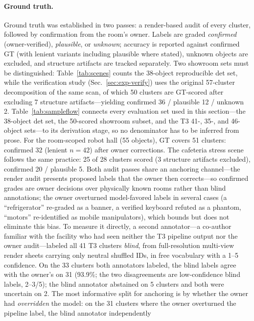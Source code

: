 \paragraph{Ground truth.}
Ground truth was established in two passes: a render-based audit of every
cluster, followed by confirmation from the room's owner. Labels are graded
\emph{confirmed} (owner-verified), \emph{plausible}, or \emph{unknown};
accuracy is reported against confirmed GT (with lenient variants including
plausible where stated), unknown objects are excluded, and structure
artifacts are tracked separately. Two showroom sets must be distinguished:
Table~\ref{tab:scenes} counts the 38-object reproducible det set, while the
verification study (Sec.~\ref{sec:exp-verify}) uses the original 57-cluster
decomposition of the same scan, of which 50 clusters are GT-scored after
excluding 7 structure artifacts---yielding confirmed 36 / plausible 12 /
unknown 2. Table~\ref{tab:sampleflow} connects every evaluation set used
in this section---the 38-object det set, the 50-scored showroom subset,
and the T3 41-, 35-, and 46-object sets---to its derivation stage, so no
denominator has to be inferred from prose. For the room-scoped robot hall (55 objects), GT covers 51
clusters: confirmed 32 (lenient $n{=}42$) after owner corrections. The
cafeteria stress scene follows the same practice: 25 of 28 clusters scored
(3 structure artifacts excluded), confirmed 20 / plausible 5. Both audit
passes share an anchoring channel---the render audit presents proposed
labels that the owner then corrects---so confirmed grades are owner
decisions over physically known rooms rather than blind annotations; the
owner overturned model-favored labels in several cases (a
``refrigerator'' re-graded as a banner, a verified keyboard refuted as a
phantom, ``motors'' re-identified as mobile manipulators), which bounds
but does not eliminate this bias. To measure it directly, a second
annotator---a co-author familiar with the facility who had seen neither
the T3 pipeline output nor the owner audit---labeled all 41 T3 clusters
\emph{blind}, from full-resolution multi-view render sheets carrying only
neutral shuffled IDs, in free vocabulary with a 1--5 confidence. On the
33 clusters both annotators labeled, the blind labels agree with the
owner's on 31 (93.9\%; the two disagreements are low-confidence blind
labels, 2--3/5); the blind annotator abstained on 5 clusters and both
were uncertain on 2. The most informative split for anchoring is by whether the owner had
\emph{overridden} the model: on the 31 clusters where the owner
overturned the pipeline label, the blind annotator independently
